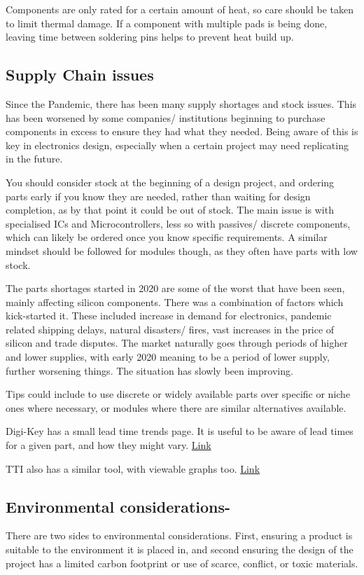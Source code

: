 \documentclass[a4paper,11pt]{report}
\begin{document}
Components are only rated for a certain amount of heat, so care should be taken to limit thermal damage. If a component with multiple pads is being done, leaving time between soldering pins helps to prevent heat build up.

\subsection{Supply Chain issues}

Since the Pandemic, there has been many supply shortages and stock issues. This has been worsened by some companies/ institutions beginning to purchase components in excess to ensure they had what they needed. Being aware of this is key in electronics design, especially when a certain project may need replicating in the future.

You should consider stock at the beginning of a design project, and ordering parts early if you know they are needed, rather than waiting for design completion, as by that point it could be out of stock. The main issue is with specialised ICs and Microcontrollers, less so with passives/ discrete components, which can likely be ordered once you know specific requirements. A similar mindset should be followed for modules though, as they often have parts with low stock.

The parts shortages started in 2020 are some of the worst that have been seen, mainly affecting silicon components. There was a combination of factors which kick-started it. These included increase in demand for electronics, pandemic related shipping delays, natural disasters/ fires, vast increases in the price of silicon and trade disputes. The market naturally goes through periods of higher and lower supplies, with early 2020 meaning to be a period of lower supply, further worsening things. The situation has slowly been improving.

Tips could include to use discrete or widely available parts over specific or niche ones where necessary, or modules where there are similar alternatives available.

Digi-Key has a small lead time trends page. It is useful to be aware of lead times for a given part, and how they might vary. \href{https://www.digikey.co.uk/en/resources/reports/lead-time-trends}{Link}

TTI also has a similar tool, with viewable graphs too. \href{https://www.tti.com/content/ttiinc/en/apps/lead-time-trends.html}{Link}

\subsection{Environmental considerations-}
There are two sides to environmental considerations. First, ensuring a product is suitable to the environment it is placed in, and second ensuring the design of the project has a limited carbon footprint or use of scarce, conflict, or toxic materials.
\end{document}
